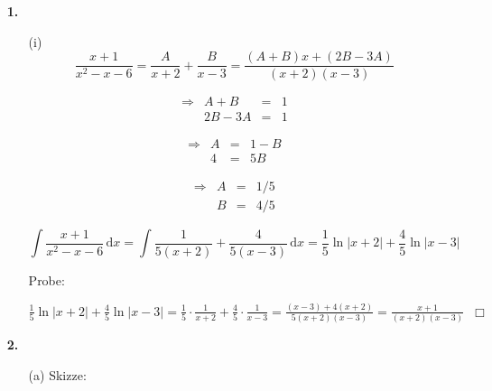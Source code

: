 \documentclass[a4paper,11pt,fleqn]{scrartcl}
\author{\authorinfo}
\title{\titleinfo}
\date{\today}
\newcommand{\dX}[1]{\, \mathrm{d}#1}
\newcommand{\dx}[0]{\dX{x}}
\begin{document}
\maketitle
\begin{enumerate}
    \item[\textbf{1.}]
        \begin{enumerate}
            \item[(i)]
                \[ \frac{x+1}{x^2-x-6} = \frac{A}{x+2} + \frac{B}{x-3} = \frac{(A+B)x + (2B - 3A)}{(x+2)(x-3)} \]
                \begin{multicols}{3}
                    \[\begin{array}{lrcl}
                        \Rightarrow & A + B &=& 1\\
                        & 2B - 3A &=& 1
                    \end{array}\]

                    \[\begin{array}{lrcl}
                        \Rightarrow & A &=& 1 - B\\
                        & 4 &=& 5B
                    \end{array}\]

                    \[\begin{array}{lrcl}
                        \Rightarrow & A &=& 1 / 5\\
                        & B &=& 4 / 5
                    \end{array}\]
                \end{multicols}

                \[ \int \frac{x+1}{x^2-x-6} \dx = \int \frac{1}{5(x+2)} + \frac{4}{5(x-3)} \dx = \frac{1}{5} \ln |x+2| + \frac{4}{5} \ln |x-3| \]

                Probe:

                \( \frac{1}{5} \ln |x+2| + \frac{4}{5} \ln |x-3| = \frac{1}{5} \cdot \frac{1}{x+2} + \frac{4}{5} \cdot \frac{1}{x-3} = \frac{(x-3)+4(x+2)}{5(x+2)(x-3)} = \frac{x + 1}{(x+2)(x-3)} \;\;\Box \)
        \end{enumerate}
    \item[\textbf{2.}]
        \begin{enumerate}
            \item[(a)]
                Skizze:


\end{enumerate}
\end{enumerate}
\end{document}
